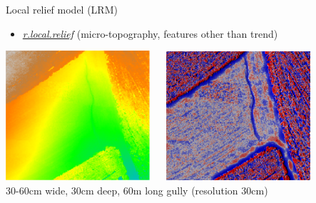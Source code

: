\documentclass[xcolor={dvipsnames,usenames},beamer,aspectratio=43]{beamer}
\newcommand{\amodule}[1]{\href{http://grass.osgeo.org/grass70/manuals/addons/#1.html}{\emph{#1}}}
\begin{document}
\begin{frame}{Local relief model (LRM)}

\begin{itemize}
  \item \amodule{r.local.relief} (micro-topography, features other than trend)
\end{itemize}

\begin{center}
  \includegraphics[width=0.4\textwidth]{vis/elevation}
  ~~
  \includegraphics[width=0.4\textwidth]{vis/lrm}\\
  \footnotesize
  30-60cm wide, 30cm deep, 60m long gully (resolution 30cm)
\end{center}

\end{frame}
\end{document}
